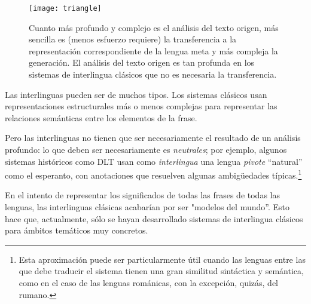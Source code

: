 \begin{figure} \begin{center} \texttt{[image: triangle]} \end{center} \caption{Cuanto más profundo y complejo es el análisis del texto origen, más sencilla es (menos esfuerzo requiere) la transferencia a la representación correspondiente de la lengua meta y más compleja la generación. El análisis del texto origen es tan profunda en los sistemas de interlingua clásicos que no es necesaria la transferencia.} \label{fg:triangle} \end{figure} 

Las interlinguas pueden ser de muchos tipos. Los sistemas clásicos usan representaciones estructurales más o menos complejas para representar las relaciones semánticas entre los elementos de la frase. 

Pero las interlinguas no tienen que ser necesariamente el resultado de un análisis profundo: lo que deben ser necesariamente es \emph{neutrales}; por ejemplo, algunos sistemas históricos como DLT \citep[cap.~17]{hutchins92b} usan como \emph{interlingua} una lengua \emph{pivote} ``natural'' como el esperanto, con anotaciones que resuelven algunas ambigüedades típicas.\footnote{Esta aproximación puede ser particularmente útil cuando las lenguas entre las que debe traducir el sistema tienen una gran similitud sintáctica y semántica, como en el caso de las lenguas románicas, con la excepción, quizás, del rumano.} 

En el intento de representar los significados de todas las frases de todas las lenguas, las interlinguas clásicas acabarían por ser "modelos del mundo''. Esto hace que, actualmente, sólo se hayan desarrollado sistemas de interlingua clásicos para ámbitos temáticos muy concretos. 

